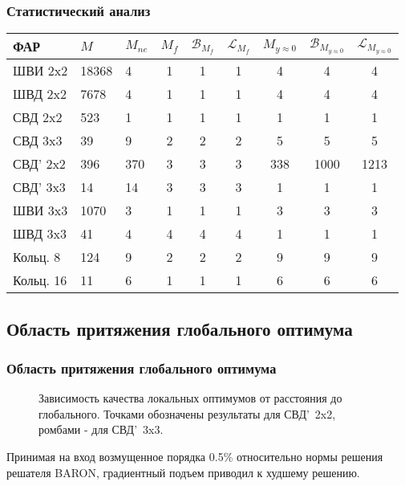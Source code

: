 \begin{frame}
    \frametitle{Статистический анализ}
    \begin{table}[!h]
    \centering
     \begin{tabular}{|l | l l | c c c | c c c|}
    \hline
    \textbf{ФАР} & \textbf{$M$} & \textbf{$M_{ne}$} & \textbf{$M_{f}$} & \textbf{$\mathcal{B}_{M_f}$} & \textbf{$\mathcal{L}_{M_f}$} & \textbf{$M_{y\approx0}$} & \textbf{$\mathcal{B}_{M_{y\approx0}}$} & \textbf{$\mathcal{L}_{M_{y\approx0}}$}\\
    \hline
    ШВИ 2x2 & 18368 & 4 & 1 & 1 & 1 & 4 & 4 & 4\\
    ШВД 2x2 & 7678  & 4 & 1 & 1 & 1 & 4 & 4 & 4\\
    СВД 2x2  & 523  & 1 & 1 & 1 & 1 & 1 & 1 & 1\\
    СВД 3x3  & 39  & 9 & 2 & 2 & 2 & 5 & 5 & 5\\
    СВД' 2x2  & 396  & 370 & 3 & 3 & 3 & 338 & 1000 & 1213\\
    СВД' 3x3  & 14  & 14 & 3 & 3 & 3 & 1 & 1 & 1\\
    ШВИ 3x3 & 1070  & 3 & 1 & 1 & 1 & 3 & 3 & 3 \\
    ШВД 3x3 & 41  & 4 & 4 & 4 & 4 & 1 & 1 & 1 \\
    Кольц. 8 & 124  & 9 & 2 & 2 & 2 & 9 & 9 & 9\\
    Кольц. 16 & 11  & 6 & 1 & 1 & 1& 6 & 6 & 6\\
    \hline
\end{tabular}
    \label{tab:structure2}
\end{table}
\end{frame}

\subsection{Область притяжения глобального оптимума}
\begin{frame}
    \frametitle{Область притяжения глобального оптимума}

    \begin{figure}
    \centering
        \begin{minipage}[h]{0.8\linewidth}
        \end{minipage}
        \vspace{0.7em}
        \caption{Зависимость качества локальных оптимумов от расстояния до глобального. Точками обозначены результаты для СВД'~2x2, ромбами - для СВД'~3x3.}
        \label{ris:fit_dist_2}
    \end{figure}

    Принимая на вход возмущенное порядка 0.5\% относительно нормы решения решателя BARON, градиентный подъем приводил к худшему решению.
\end{frame}


